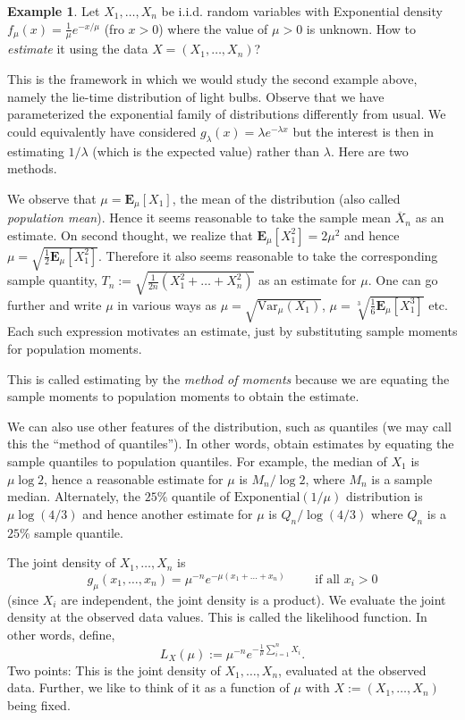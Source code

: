 \documentclass[preprint,  11pt]{amsart}
\newcommand{\para}[1]{\vspace{4mm}\noindent{\bfseries #1:}}
\theoremstyle{plain} %
\theoremstyle{definition} %
\newtheorem{example}[theorem]{Example}
\begin{document}
 \begin{example}Let $X_{1},\ldots ,X_{n}$ be i.i.d. random variables with Exponential density $f_{\mu}(x)=\frac{1}{\mu}e^{-x/\mu}$ (fro $x>0$) where the value of $\mu>0$ is unknown. How to  {\em estimate} it using the data $X=(X_{1},\ldots ,X_{n})$?


This is the framework in which we would study the second example above, namely the lie-time distribution of light bulbs. Observe that we have parameterized the exponential family of distributions differently from usual. We could equivalently have considered $g_{\lambda}(x)=\lambda e^{-\lambda x}$ but the interest is then in estimating $1/\lambda$ (which is the expected value) rather than $\lambda$. Here are two methods.

\para{Method of moments} We observe that $\mu=\mathbf{E}_{\mu}[X_{1}]$, the mean of the distribution (also called {\em population mean}). Hence it seems reasonable to take the sample mean $\overline{X}_{n}$ as an estimate. On second thought, we realize that $\mathbf{E}_{\mu}[X_{1}^{2}]=2\mu^{2}$ and hence $\mu=\sqrt{\frac{1}{2}\mathbf{E}_{\mu}[X_{1}^{2}]}$. Therefore it also seems reasonable to take the corresponding sample quantity, $T_{n}:=\sqrt{\frac{1}{2n}(X_{1}^{2}+\ldots +X_{n}^{2})}$ as an estimate for $\mu$. One can go further and write $\mu$ in various ways as $\mu=\sqrt{\mbox{Var}_{\mu}(X_{1})}$, $\mu=\sqrt[3]{\frac{1}{6}\mathbf{E}_{\mu}[X_{1}^{3}]}$ etc. Each such expression motivates an estimate, just by substituting sample moments for population moments.

This is called estimating by the {\em method of moments} because we are equating the sample moments to population moments to obtain the estimate.

We can also use other features of the distribution, such as quantiles (we may call this  the ``method of quantiles''). In other words, obtain estimates by equating the sample quantiles to population quantiles. For example, the median of $X_{1}$ is $\mu\log 2$, hence a reasonable estimate for $\mu$ is $M_{n}/\log 2$, where $M_{n}$ is a sample median. Alternately, the $25\%$ quantile of $\mbox{Exponential}(1/\mu)$ distribution is $\mu\log(4/3)$ and hence another estimate for $\mu$ is $Q_{n}/\log(4/3)$ where $Q_{n}$ is a $25\%$ sample quantile.

\para{Maximum likelihood method} The joint density of $X_{1},\ldots ,X_{n}$ is $$g_{\mu}(x_{1},\ldots ,x_{n})=\mu^{-n}e^{-\mu(x_{1}+\ldots +x_{n})} \qquad \mbox{ if all }x_{i}>0$$ (since $X_{i}$ are independent, the joint density is a product). We evaluate the joint density at the observed data values. This is called the likelihood function. In other words, define,
$$
L_{X}(\mu) := \mu^{-n}e^{-\frac{1}{\mu}\sum_{i=1}^{n}X_{i}}.
$$
Two points: This is the joint density of $X_{1},\ldots ,X_{n}$, evaluated at the observed data. Further, we like to think of it as a function of $\mu$ with $X:=(X_{1},\ldots ,X_{n})$ being fixed. 


\end{example}
\end{document}
